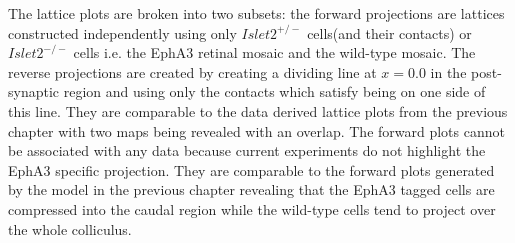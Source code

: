 The lattice plots are broken into two subsets: the forward projections are lattices constructed independently using only $Islet2^{+/-}$ cells(and their contacts) or $Islet2^{-/-}$ cells i.e. the EphA3 retinal mosaic and the wild-type mosaic. The reverse projections are created by creating a dividing line at $x = 0.0$ in the post-synaptic region and using only the contacts which satisfy being on one side of this line. They are comparable to the data derived lattice plots from the previous chapter with two maps being revealed with an overlap. The forward plots cannot be associated with any data because current experiments do not highlight the EphA3 specific projection. They are comparable to the forward plots generated by the model in the previous chapter revealing that the EphA3 tagged cells are compressed into the caudal region while the wild-type cells tend to project over the whole colliculus.

